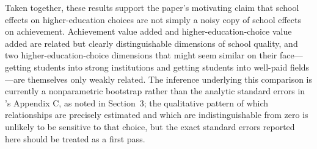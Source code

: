 \documentclass[a4paper, article, english, oneside, unknownkeysallowed, 12pt]{memoir}
\begin{document}
Taken together, these results support the paper's motivating claim that school effects on higher-education choices are not simply a noisy copy of school effects on achievement.
Achievement value added and higher-education-choice value added are related but clearly distinguishable dimensions of school quality, and two higher-education-choice dimensions that might seem similar on their face---getting students into strong institutions and getting students into well-paid fields---are themselves only weakly related.
The inference underlying this comparison is currently a nonparametric bootstrap rather than the analytic standard errors in \textcite{rose_effects_2022}'s Appendix C, as noted in Section~3; the qualitative pattern of which relationships are precisely estimated and which are indistinguishable from zero is unlikely to be sensitive to that choice, but the exact standard errors reported here should be treated as a first pass.


\end{document}
